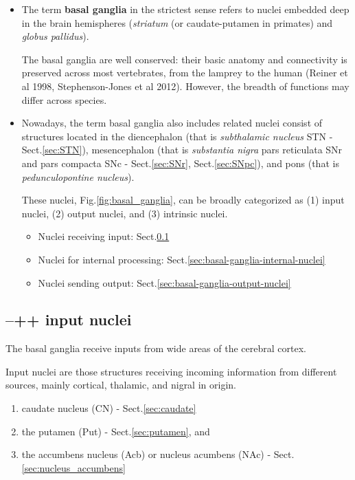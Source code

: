 \begin{itemize}
  
  \item  The term {\bf basal ganglia} in the strictest sense refers to nuclei
  embedded deep in the brain hemispheres  ({\it striatum} (or caudate-putamen in
  primates) and {\it globus pallidus}). 

The basal ganglia are well conserved: their basic anatomy and connectivity is
preserved across most vertebrates, from the lamprey to the human (Reiner et al
1998, Stephenson-Jones et al 2012). However, the breadth of functions may
differ across species.

  \item Nowadays, the term basal ganglia also includes related nuclei consist of
  structures located in the diencephalon (that is {\it subthalamic nucleus} STN
  - Sect.\ref{sec:STN}), mesencephalon (that is {\it substantia nigra} pars
  reticulata SNr and pars compacta SNc - Sect.\ref{sec:SNr}, 
  Sect.\ref{sec:SNpc}), and pons (that is {\it pedunculopontine nucleus}).

These nuclei, Fig.\ref{fig:basal_ganglia}, can be broadly categorized as (1)
input nuclei, (2) output nuclei, and (3) intrinsic nuclei.
\begin{itemize}
  \item Nuclei receiving input: Sect.\ref{sec:basal-ganglia-input-nuclei}

  \item Nuclei for internal processing:
  Sect.\ref{sec:basal-ganglia-internal-nuclei}

  \item Nuclei sending output: Sect.\ref{sec:basal-ganglia-output-nuclei}
\end{itemize}

\end{itemize}

\subsection{--++ input nuclei}
\label{sec:basal-ganglia-input-nuclei}

The basal ganglia receive inputs from wide areas of the cerebral cortex.

Input nuclei are those structures receiving incoming information from different
sources, mainly cortical, thalamic, and nigral in origin. 
\begin{enumerate}
  \item  caudate nucleus (CN) - Sect.\ref{sec:caudate}
  
  \item the putamen (Put) - Sect.\ref{sec:putamen}, and 
  
  \item the accumbens nucleus  (Acb) or nucleus acumbens (NAc) -
  Sect.\ref{sec:nucleus_accumbens}
\end{enumerate}

